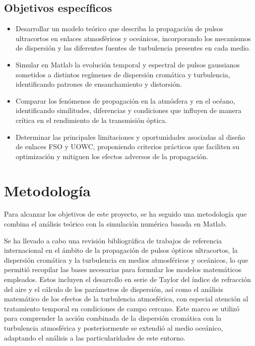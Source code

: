 \subsection*{Objetivos específicos}
\begin{itemize}
    \item Desarrollar un modelo teórico que describa la propagación de pulsos ultracortos en enlaces atmosféricos y oceánicos, incorporando los mecanismos de dispersión y las diferentes fuentes de turbulencia presentes en cada medio.

    \item Simular en Matlab la evolución temporal y espectral de pulsos gaussianos sometidos a distintos regímenes de dispersión cromática y turbulencia, identificando patrones de ensanchamiento y distorsión.

    \item Comparar los fenómenos de propagación en la atmósfera y en el océano, identificando similitudes, diferencias y condiciones que influyen de manera crítica en el rendimiento de la transmisión óptica.
    
    \item Determinar las principales limitaciones y oportunidades asociadas al diseño de enlaces FSO y UOWC, proponiendo criterios prácticos que faciliten su optimización y mitiguen los efectos adversos de la propagación.
\end{itemize}

\section{Metodología}
Para alcanzar los objetivos de este proyecto, se ha seguido una metodología que combina el análisis teórico con la simulación numérica basada en Matlab. 

Se ha llevado a cabo una revisión bibliográfica de trabajos de referencia internacional en el ámbito de la propagación de pulsos ópticos ultracortos, la dispersión cromática y la turbulencia en medios atmosféricos y oceánicos, lo que permitió recopilar las bases necesarias para formular los modelos matemáticos empleados. Estos incluyen el desarrollo en serie de Taylor del índice de refracción del aire y el cálculo de los parámetros de dispersión, así como el análisis matemático de los efectos de la turbulencia atmosférica, con especial atención al tratamiento temporal en condiciones de campo cercano. Este marco se utilizó para comprender la acción combinada de la dispersión cromática con la turbulencia atmosférica y posteriormente se extendió al medio oceánico, adaptando el análisis a las particularidades de este entorno.

